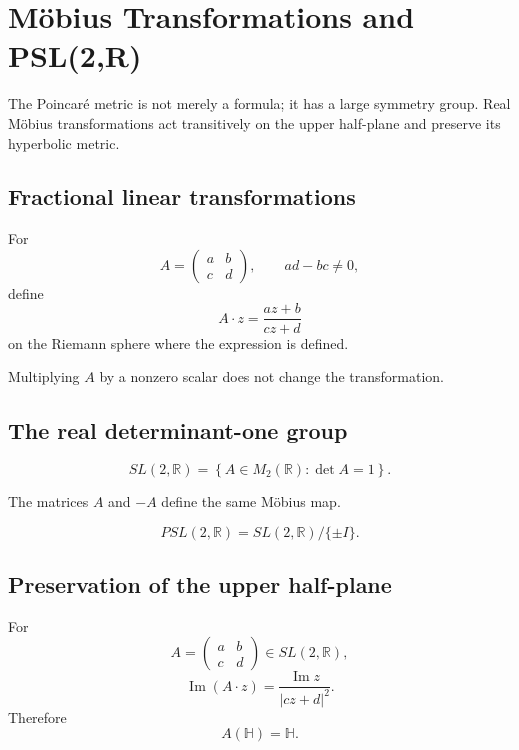\chapter{Möbius Transformations and PSL(2,R)}
\label{ch:vii33-mobius-psl2r}

The Poincaré metric is not merely a formula; it has a large symmetry group.
Real Möbius transformations act transitively on the upper half-plane and preserve
its hyperbolic metric.

\section{Fractional linear transformations}

\begin{definition}\label{def:vii33-mobius}
For
\[
A=
\begin{pmatrix}
a&b\\ c&d
\end{pmatrix},
\qquad
ad-bc\ne0,
\]
define
\[
A\cdot z
=
\frac{az+b}{cz+d}
\]
on the Riemann sphere where the expression is defined.
\end{definition}

Multiplying \(A\) by a nonzero scalar does not change the transformation.

\section{The real determinant-one group}

\begin{definition}\label{def:vii33-sl2}
\[
SL(2,\mathbb R)
=
\left\{
A\in M_2(\mathbb R):\det A=1
\right\}.
\]
\end{definition}

The matrices \(A\) and \(-A\) define the same Möbius map.

\begin{definition}\label{def:vii33-psl2}
\[
PSL(2,\mathbb R)
=
SL(2,\mathbb R)/\{\pm I\}.
\]
\end{definition}

\section{Preservation of the upper half-plane}

\begin{theorem}\label{thm:vii33-imag}
For
\[
A=
\begin{pmatrix}a&b\\c&d\end{pmatrix}
\in SL(2,\mathbb R),
\]
\[
\operatorname{Im}(A\cdot z)
=
\frac{\operatorname{Im}z}{|cz+d|^2}.
\]
Therefore
\[
A(\mathbb H)=\mathbb H.
\]
\end{theorem}

